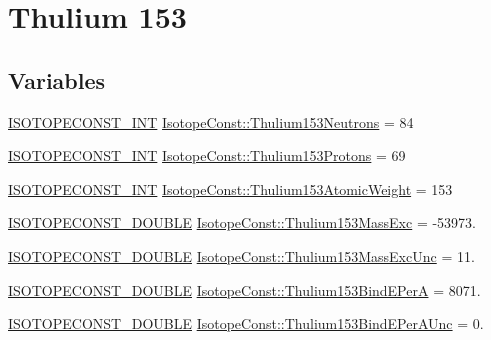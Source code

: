 \hypertarget{group___isotope_const-_thulium-_tm153}{}\section{Thulium 153}
\label{group___isotope_const-_thulium-_tm153}
\subsection*{Variables}
\begin{DoxyCompactItemize}
\item 
\mbox{\hyperlink{group___isotope_const-_macros_ga5f18360b3e99483a35c32d789e62621c}{I\+S\+O\+T\+O\+P\+E\+C\+O\+N\+S\+T\+\_\+\+I\+NT}} \mbox{\hyperlink{group___isotope_const-_thulium-_tm153_ga438ebc14e4f08b4c72df32f495edde6c}{Isotope\+Const\+::\+Thulium153\+Neutrons}} = 84
\item 
\mbox{\hyperlink{group___isotope_const-_macros_ga5f18360b3e99483a35c32d789e62621c}{I\+S\+O\+T\+O\+P\+E\+C\+O\+N\+S\+T\+\_\+\+I\+NT}} \mbox{\hyperlink{group___isotope_const-_thulium-_tm153_gac40c4ad695e11834d72933329403bcce}{Isotope\+Const\+::\+Thulium153\+Protons}} = 69
\item 
\mbox{\hyperlink{group___isotope_const-_macros_ga5f18360b3e99483a35c32d789e62621c}{I\+S\+O\+T\+O\+P\+E\+C\+O\+N\+S\+T\+\_\+\+I\+NT}} \mbox{\hyperlink{group___isotope_const-_thulium-_tm153_ga474c5aa5861db1e7ea7da4e1732b523e}{Isotope\+Const\+::\+Thulium153\+Atomic\+Weight}} = 153
\item 
\mbox{\hyperlink{group___isotope_const-_macros_ga8f45a7272ce02c0b4c65c44636ed719a}{I\+S\+O\+T\+O\+P\+E\+C\+O\+N\+S\+T\+\_\+\+D\+O\+U\+B\+LE}} \mbox{\hyperlink{group___isotope_const-_thulium-_tm153_ga3af696aa6bd4df50c52b356a6aa7a26d}{Isotope\+Const\+::\+Thulium153\+Mass\+Exc}} = -\/53973.
\item 
\mbox{\hyperlink{group___isotope_const-_macros_ga8f45a7272ce02c0b4c65c44636ed719a}{I\+S\+O\+T\+O\+P\+E\+C\+O\+N\+S\+T\+\_\+\+D\+O\+U\+B\+LE}} \mbox{\hyperlink{group___isotope_const-_thulium-_tm153_ga3c5c28774aafd107099149c38f21e16a}{Isotope\+Const\+::\+Thulium153\+Mass\+Exc\+Unc}} = 11.
\item 
\mbox{\hyperlink{group___isotope_const-_macros_ga8f45a7272ce02c0b4c65c44636ed719a}{I\+S\+O\+T\+O\+P\+E\+C\+O\+N\+S\+T\+\_\+\+D\+O\+U\+B\+LE}} \mbox{\hyperlink{group___isotope_const-_thulium-_tm153_gae01886535c17845ebdcba8e902e5c57a}{Isotope\+Const\+::\+Thulium153\+Bind\+E\+PerA}} = 8071.
\item 
\mbox{\hyperlink{group___isotope_const-_macros_ga8f45a7272ce02c0b4c65c44636ed719a}{I\+S\+O\+T\+O\+P\+E\+C\+O\+N\+S\+T\+\_\+\+D\+O\+U\+B\+LE}} \mbox{\hyperlink{group___isotope_const-_thulium-_tm153_ga26c0ba919c824ea4f4f21ee2924ddc60}{Isotope\+Const\+::\+Thulium153\+Bind\+E\+Per\+A\+Unc}} = 0.

\end{DoxyCompactItemize}
